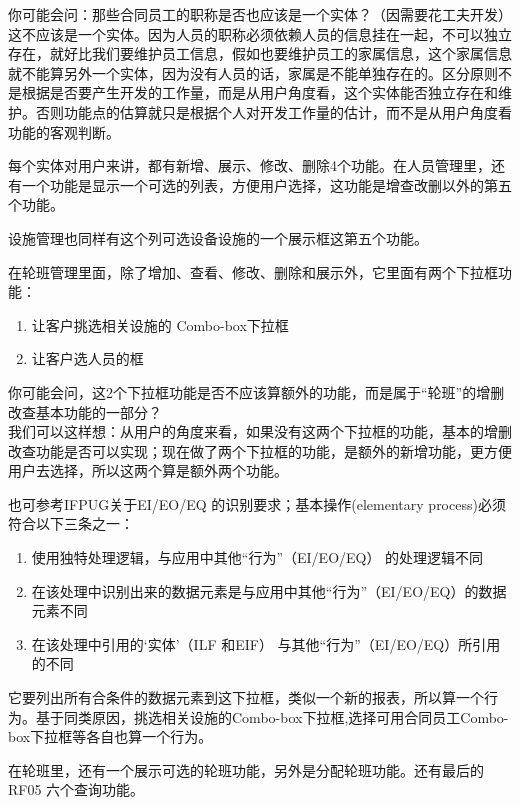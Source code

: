 你可能会问：那些合同员工的职称是否也应该是一个实体？（因需要花工夫开发）\\
这不应该是一个实体。因为人员的职称必须依赖人员的信息挂在一起，不可以独立存在，就好比我们要维护员工信息，假如也要维护员工的家属信息，这个家属信息就不能算另外一个实体，因为没有人员的话，家属是不能单独存在的。区分原则不是根据是否要产生开发的工作量，而是从用户角度看，这个实体能否独立存在和维护。否则功能点的估算就只是根据个人对开发工作量的估计，而不是从用户角度看功能的客观判断。

每个实体对用户来讲，都有新增、展示、修改、删除4个功能。在人员管理里，还有一个功能是显示一个可选的列表，方便用户选择，这功能是增查改删以外的第五个功能。

设施管理也同样有这个列可选设备设施的一个展示框这第五个功能。

在轮班管理里面，除了增加、查看、修改、删除和展示外，它里面有两个下拉框功能：

\begin{enumerate}
\tightlist
\item
  让客户挑选相关设施的 Combo-box下拉框
\item
  让客户选人员的框
\end{enumerate}

你可能会问，这2个下拉框功能是否不应该算额外的功能，而是属于``轮班''的增删改查基本功能的一部分？\\
我们可以这样想：从用户的角度来看，如果没有这两个下拉框的功能，基本的增删改查功能是否可以实现；现在做了两个下拉框的功能，是额外的新增功能，更方便用户去选择，所以这两个算是额外两个功能。

也可参考IFPUG关于EI/EO/EQ 的识别要求；基本操作(elementary
process)必须符合以下三条之一：

\begin{enumerate}
\tightlist
\item
  使用独特处理逻辑，与应用中其他``行为''（EI/EO/EQ） 的处理逻辑不同
\item
  在该处理中识别出来的数据元素是与应用中其他``行为''（EI/EO/EQ）的数据元素不同
\item
  在该处理中引用的`实体'（ILF 和EIF）
  与其他``行为''（EI/EO/EQ）所引用的不同
\end{enumerate}

它要列出所有合条件的数据元素到这下拉框，类似一个新的报表，所以算一个行为。基于同类原因，挑选相关设施的Combo-box下拉框,选择可用合同员工Combo-box下拉框等各自也算一个行为。

在轮班里，还有一个展示可选的轮班功能，另外是分配轮班功能。还有最后的
RF05 六个查询功能。


